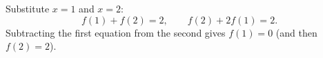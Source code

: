 Substitute $x=1$ and $x=2$:
\[
f(1)+f(2)=2,\qquad f(2)+2f(1)=2 .
\]
Subtracting the first equation from the second gives $f(1)=\boxed{0}$ (and then $f(2)=2$).
